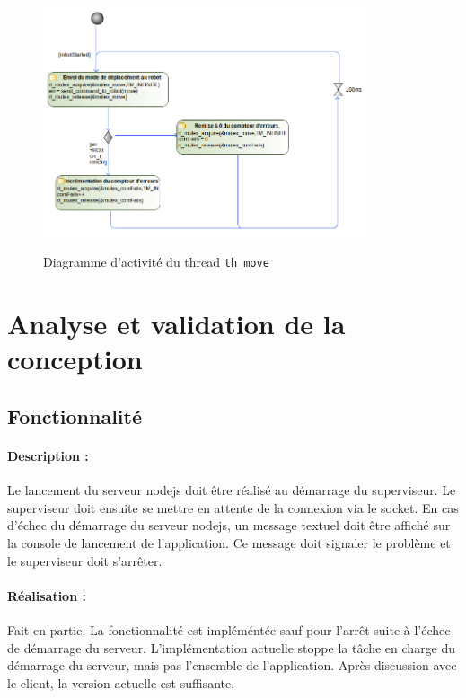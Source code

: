\documentclass[11pt, a4paper]{paper}
\newcounter{cptreq}
\begin{document}
\begin{figure}[H]
\label{fig:th_move}
\begin{center}
{\includegraphics[width=0.85\textwidth]{./figures-pdf/th_move}}
{\caption{Diagramme d'activité du thread {\tt th\_move}}}
\end{center}
\end{figure}

\section{Analyse et validation de la conception}

\subsection{Fonctionnalité \thecptreq}

\paragraph{Description :} Le lancement du serveur nodejs doit être réalisé au démarrage du superviseur. Le superviseur doit ensuite se mettre en attente de la connexion via le socket. En cas d'échec du démarrage du serveur nodejs, un message textuel doit être  affiché sur la console de lancement de l'application. Ce message doit signaler le problème et le superviseur doit s'arrêter.

\paragraph{\color{black}Réalisation :}  {\color{black} Fait en partie. La fonctionnalité est impléméntée sauf pour l'arrêt suite à l'échec de démarrage du serveur. L'implémentation actuelle stoppe la tâche en charge du démarrage du serveur, mais pas l'ensemble de l'application. Après discussion avec le client, la version actuelle est suffisante.}
\end{document}
